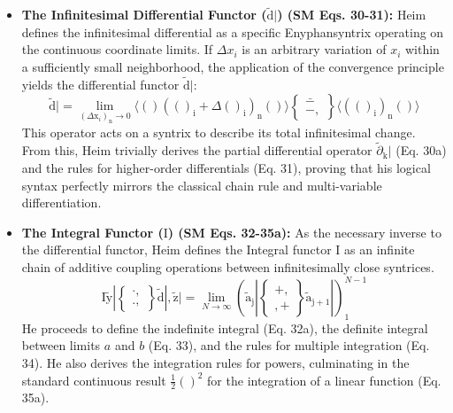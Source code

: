 \documentclass[12pt]{article}
\begin{document}
\begin{itemize}
    \item \textbf{The Infinitesimal Differential Functor (\( \tilde{\mathrm{d}}| \)) (SM Eqs. 30-31):}
    Heim defines the infinitesimal differential as a specific Enyphansyntrix operating on the continuous coordinate limits. If \( \Delta x_i \) is an arbitrary variation of \( x_i \) within a sufficiently small neighborhood, the application of the convergence principle yields the differential functor \( \tilde{\mathrm{d}}| \):
    \begin{equation}
    \tilde{\mathrm{d}}| = \lim_{(\Delta \mathrm{x}_i)_\mathrm{n} \to 0} \langle ( ) ( ( )_\mathrm{i} + \Delta( )_\mathrm{i} )_\mathrm{n} ( ) \rangle \left\{ \begin{matrix} \bar{-} \\ -, \end{matrix} \right\} \langle ( ( )_\mathrm{i} )_\mathrm{n} ( ) \rangle \tag{30}
    \label{eq:original_infinitesimal_diff}
    \end{equation}
    This operator acts on a syntrix to describe its total infinitesimal change. From this, Heim trivially derives the partial differential operator \( \tilde{\partial}_{\mathrm{k}}| \) (Eq. 30a) and the rules for higher-order differentials (Eq. 31), proving that his logical syntax perfectly mirrors the classical chain rule and multi-variable differentiation.

    \item \textbf{The Integral Functor (\( \mathrm{I} \)) (SM Eqs. 32-35a):}
    As the necessary inverse to the differential functor, Heim defines the Integral functor \( \mathrm{I} \) as an infinite chain of additive coupling operations between infinitesimally close syntrices. 
    \begin{equation}
    \mathrm{I} \tilde{\mathrm{y}}| \left\{ \begin{matrix} \cdot, \\ ., \end{matrix} \right\} \tilde{\mathrm{d}}|, \tilde{\mathrm{z}}| = \lim_{N \to \infty} ( \tilde{\mathrm{a}}_{\mathrm{j}}| \left\{ \begin{matrix} +, \\ ,+ \end{matrix} \right\} \tilde{\mathrm{a}}_{\mathrm{j}+1}| )_1^{N-1} \tag{32}
    \label{eq:original_integral_functor}
    \end{equation}
    He proceeds to define the indefinite integral (Eq. 32a), the definite integral between limits \( a \) and \( b \) (Eq. 33), and the rules for multiple integration (Eq. 34). He also derives the integration rules for powers, culminating in the standard continuous result \(\frac{1}{2}()^2\) for the integration of a linear function (Eq. 35a).


\end{itemize}
\end{document}
